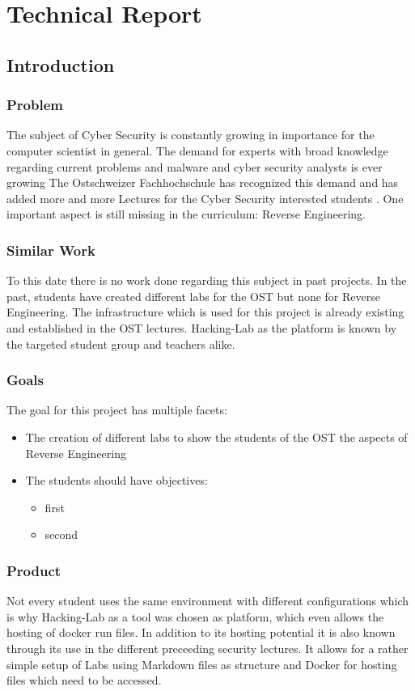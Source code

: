 \chapter{Technical Report}
\section{Introduction}
\subsection{Problem}
The subject of Cyber Security is constantly growing in importance for the computer scientist in general. The demand for experts with broad knowledge regarding current problems and malware and cyber security analysts is ever growing \cite{cybercrime-mag} The Ostschweizer Fachhochschule has recognized this demand and has added more and more Lectures for the Cyber Security interested students \cite{ost-cybersec}. One important aspect is still missing in the curriculum: Reverse Engineering.

\subsection{Similar Work}
To this date there is no work done regarding this subject in past projects. In the past, students have created different labs for the OST but none for Reverse Engineering. The infrastructure which is used for this project is already existing and established in the OST lectures. Hacking-Lab as the platform is known by the targeted student group and teachers alike. 

\subsection{Goals}
The goal for this project has multiple facets:
\begin{itemize}
    \item The creation of different labs to show the students of the OST the aspects of Reverse Engineering
    \item The students should have objectives:
    \begin{itemize}
        \item first
        \item second
    \end{itemize}
\end{itemize}
\subsection{Product}
Not every student uses the same environment with different configurations which is why Hacking-Lab as a tool was chosen as platform, which even allows the hosting of docker run files. In addition to its hosting potential it is also known through its use in the different preceeding security lectures. It allows for a rather simple setup of Labs using Markdown files as structure and Docker for hosting files which need to be accessed.
